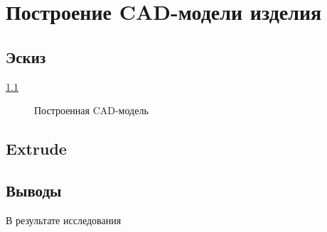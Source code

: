 
\chapter{Построение CAD-модели изделия} \label{ch1}

\section{Эскиз} \label{ch1:sec1}

\ref{fig:cad-model}

\begin{figure}[H] 
	\center
	\caption{Построенная CAD-модель} 
	\label{fig:cad-model}
\end{figure}


\section{Extrude} \label{ch1:sec2}


\section{Выводы} \label{ch1:conclusion}

В результате исследования 
